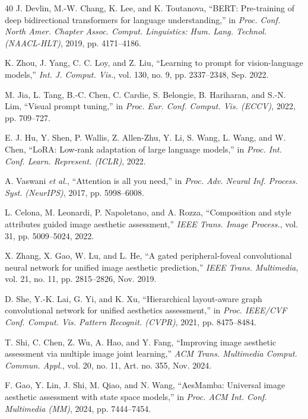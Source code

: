 \documentclass[journal]{IEEEtran}
\begin{document}
\begin{thebibliography}{40}
J. Devlin, M.-W. Chang, K. Lee, and K. Toutanova, ``BERT: Pre-training of deep bidirectional transformers for language understanding,'' in \emph{Proc. Conf. North Amer. Chapter Assoc. Comput. Linguistics: Hum. Lang. Technol. (NAACL-HLT)}, 2019, pp. 4171--4186.

K. Zhou, J. Yang, C. C. Loy, and Z. Liu, ``Learning to prompt for vision-language models,'' \emph{Int. J. Comput. Vis.}, vol. 130, no. 9, pp. 2337--2348, Sep. 2022.

M. Jia, L. Tang, B.-C. Chen, C. Cardie, S. Belongie, B. Hariharan, and S.-N. Lim, ``Visual prompt tuning,'' in \emph{Proc. Eur. Conf. Comput. Vis. (ECCV)}, 2022, pp. 709--727.

E. J. Hu, Y. Shen, P. Wallis, Z. Allen-Zhu, Y. Li, S. Wang, L. Wang, and W. Chen, ``LoRA: Low-rank adaptation of large language models,'' in \emph{Proc. Int. Conf. Learn. Represent. (ICLR)}, 2022.

A. Vaswani \emph{et al.}, ``Attention is all you need,'' in \emph{Proc. Adv. Neural Inf. Process. Syst. (NeurIPS)}, 2017, pp. 5998--6008.

L. Celona, M. Leonardi, P. Napoletano, and A. Rozza, ``Composition and style attributes guided image aesthetic assessment,'' \emph{IEEE Trans. Image Process.}, vol. 31, pp. 5009--5024, 2022.

X. Zhang, X. Gao, W. Lu, and L. He, ``A gated peripheral-foveal convolutional neural network for unified image aesthetic prediction,'' \emph{IEEE Trans. Multimedia}, vol. 21, no. 11, pp. 2815--2826, Nov. 2019.

D. She, Y.-K. Lai, G. Yi, and K. Xu, ``Hierarchical layout-aware graph convolutional network for unified aesthetics assessment,'' in \emph{Proc. IEEE/CVF Conf. Comput. Vis. Pattern Recognit. (CVPR)}, 2021, pp. 8475--8484.

T. Shi, C. Chen, Z. Wu, A. Hao, and Y. Fang, ``Improving image aesthetic assessment via multiple image joint learning,'' \emph{ACM Trans. Multimedia Comput. Commun. Appl.}, vol. 20, no. 11, Art. no. 355, Nov. 2024.

F. Gao, Y. Lin, J. Shi, M. Qiao, and N. Wang, ``AesMamba: Universal image aesthetic assessment with state space models,'' in \emph{Proc. ACM Int. Conf. Multimedia (MM)}, 2024, pp. 7444--7454.

\end{thebibliography}
\end{document}
